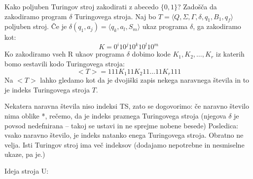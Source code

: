 \documentclass[10pt,a4paper,oneside]{book}
\begin{document}

Kako poljuben Turingov stroj zakodirati z abecedo $\{0,1\}$?
Zadošča da zakodiramo program $\delta$ Turingovega stroja.%
Naj bo $T=\langle Q,\Sigma,\Gamma,\delta,q_1,B_1,q_f \rangle$ poljuben stroj.%
Če je $\delta(q_1,a_j)=\langle q_k, a_l, S_m \rangle$ ukaz programa $\delta$, ga zakodiramo kot:
	\[ K=0^i 1 0^j 1 0^k 1 0^l 1 0^m\]
Ko zakodiramo vseh R ukaov programa $\delta$ dobimo kode $K_1, K_2, \dots, K_r$ iz katerih bomo sestavili kodo Turingovega stroja:
	\[ <T> = 111 K_1 11 K_2 11 \dots 11 K_r 111\]%
Na $<T>$ lahko gledamo kot da je dvojiški zapis nekega naravnega števila in to je indeks Turingovega stroja $T$.

Nekatera naravna števila niso indeksi TS, zato se dogovorimo: če naravno število nima oblike *, rečemo, da je indeks praznega Turingovega stroja (njegova $\delta$ je povsod nedefnirana -- takoj se ustavi in ne sprejme nobene besede)
Posledica: vsako naravno število, je indeks natanko enega Turingovega stroja.
Obratno ne velja. Isti Turingov stroj ima več indeksov (dodajamo nepotrebne in nesmiselne ukaze, pa je.)
%


Ideja stroja U:

\end{document}
